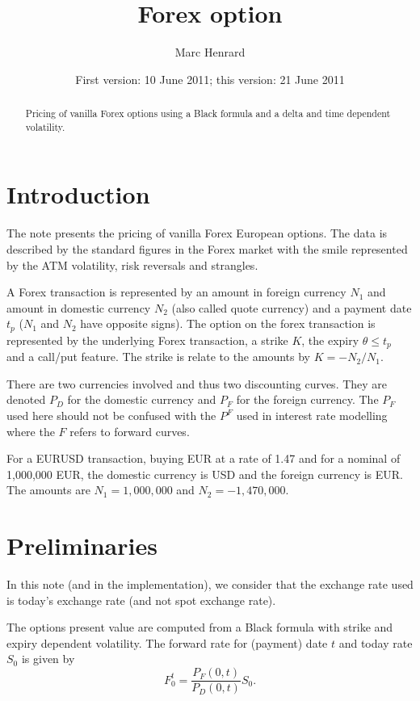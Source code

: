 \documentclass[]{amsart}
\title[Forex options]%
   {Forex option}
\author[M. Henrard]%
   {Marc Henrard}
\date{First version: 10 June 2011; this version: 21 June 2011}
\begin{document}
\maketitle

\begin{center}
\end{center}

\begin{abstract}
Pricing of vanilla Forex options using a Black formula and a delta and time dependent volatility.
\end{abstract}

\section{Introduction}

The note presents the pricing of vanilla Forex European options. The data is described by the standard figures in the Forex market with the smile represented by the ATM volatility, risk reversals and strangles.

A Forex transaction is represented by an amount in foreign currency $N_1$ and amount in domestic currency $N_2$ (also called quote currency) and a payment date $t_p$ ($N_1$ and $N_2$ have opposite signs). The option on the forex transaction is represented by the underlying Forex transaction, a strike $K$, the expiry $\theta \leq t_p$ and a call/put feature. The strike is relate to the amounts by $K = -N_2/N_1$. 

There are two currencies involved and thus two discounting curves. They are denoted $P_D$ for the domestic currency and $P_F$ for the foreign currency. The $P_F$ used here should not be confused with the $P^F$ used in interest rate modelling where the $F$ refers to forward curves.

For a EURUSD transaction, buying EUR at a rate of 1.47 and for a nominal of 1,000,000 EUR, the domestic currency is USD and the foreign currency is EUR. The amounts are $N_1=1,000,000$ and $N_2=-1,470,000$.

\section{Preliminaries}

In this note (and in the implementation), we consider that the exchange rate used is today's exchange rate (and not spot exchange rate). 

The options present value are computed from a Black formula with strike and expiry dependent volatility. The forward rate for (payment) date $t$ and today rate $S_0$ is given by
\[
F^{t}_0 = \frac{P_F(0,t)}{P_D(0,t)} S_0.
\]
\end{document}
